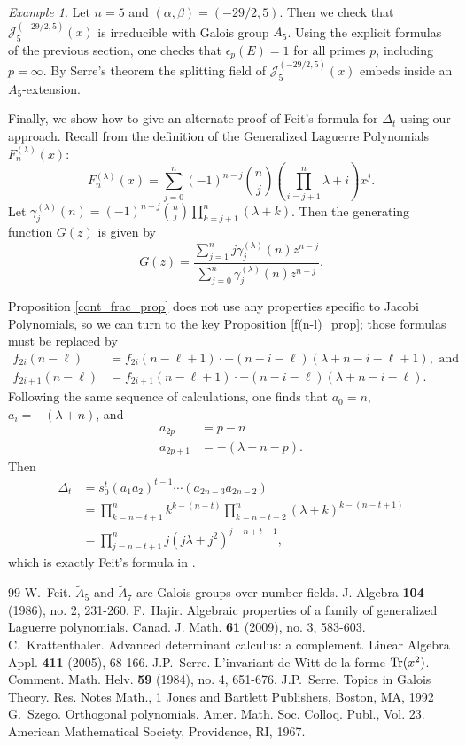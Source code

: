 \documentclass{amsart}
\theoremstyle{plain}
\theoremstyle{remark}
\newtheorem{exm}[equation]{Example}
\begin{document}
\begin{exm}
Let $n=5$ and $(\alpha,\beta) = (-29/2,5)$.  Then we check that $\mathscr{J}_5^{(-29/2,5)}(x)$ is irreducible with Galois group $A_5$.  Using the explicit formulas of the previous section, one checks that $\epsilon_p(E) = 1$ for all primes $p$, including $p=\infty$. By Serre’s theorem the splitting field of $\mathscr{J}_5^{(-29/2,5)}(x)$ embeds inside an $\widetilde{A}_5$-extension.
\end{exm}

Finally, we show how to give an alternate proof of Feit's formula for $\Delta_t$ using our approach.  Recall from \cite{feit} the definition of the Generalized Laguerre Polynomials $F_n^{(\lambda)}(x)$:
\[
F_n^{(\lambda)}(x) = \sum_{j=0}^n (-1)^{n-j}\binom{n}{j} \left(\prod_{i=j+1}^n \lambda + i\right)x^j.
\]
Let $\gamma_j^{(\lambda)}(n) = (-1)^{n-j}\binom{n}{j} \prod_{k=j+1}^n(\lambda+k)$.  Then the generating function $G(z)$ is given by
\[
G(z) = \frac{\sum_{j=1}^n j\gamma_j^{(\lambda)}(n)z^{n-j}}{\sum_{j=0}^n \gamma_j^{(\lambda)}(n)z^{n-j}}.
\]

Proposition \ref{cont_frac_prop} does not use any properties specific to Jacobi Polynomials, so we can turn to the key Proposition \ref{f(n-l)_prop}; those formulas must be replaced by 
\begin{align*}
f_{2i}(n-\ell) &= f_{2i}(n-\ell+1) \cdot -(n-i-\ell)(\lambda + n -i-\ell+1),\text{ and} \\
f_{2i+1}(n-\ell) &= f_{2i+1}(n-\ell+1) \cdot -(n-i-\ell)(\lambda + n -i-\ell).
\end{align*}
Following the same sequence of calculations, one finds that $a_0=n$, $a_i = -(\lambda+n)$, and 
\begin{align*}
a_{2p} &=p-n \\
a_{2p+1} &= -(\lambda+n-p). 
\end{align*}
Then 
\begin{align*}
\Delta_t &= s_0^t (a_1a_2)^{t-1} \cdots (a_{2n-3}a_{2n-2}) \\
&=\prod_{k=n-t+1}^n k^{k-(n-t)} \prod_{k=n-t+2}^n (\lambda+k)^{k-(n-t+1)} \\
&=\prod_{j=n-t+1}^n j(j\lambda + j^2)^{j-n+t-1},
\end{align*}
which is exactly Feit's formula in  \cite[Thm.~5.1]{feit}.

\begin{thebibliography}{99}
 W.~Feit.  $\widetilde{A}_{5}$ and $\widetilde{A}_{7}$ are Galois groups over number fields.
J. Algebra \textbf{104} (1986), no. 2, 231-260.
 F.~Hajir. Algebraic properties of a family of generalized Laguerre polynomials.
Canad. J. Math. \textbf{61} (2009), no. 3, 583-603.
 C.~Krattenthaler. Advanced determinant calculus: a complement. 
Linear Algebra Appl. \textbf{411} (2005), 68-166.
 J.P.~Serre. L'invariant de Witt de la forme ${\rm Tr}(x^2)$.
Comment. Math. Helv. \textbf{59} (1984), no. 4, 651-676.
 J.P.~Serre. Topics in Galois Theory. Res. Notes Math., 1
Jones and Bartlett Publishers, Boston, MA, 1992
 G.~Szego.  Orthogonal polynomials. Amer. Math. Soc. Colloq. Publ., Vol. 23.
American Mathematical Society, Providence, RI, 1967. 
\end{thebibliography}
\end{document}
